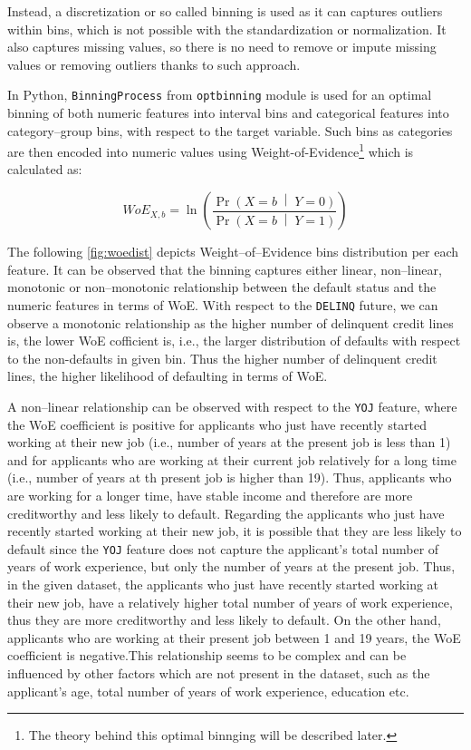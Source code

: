 Instead, a discretization or so called binning is used as it can captures outliers within bins, which is not possible with the standardization or normalization. It also captures missing values, so there is no need to remove or impute missing values or removing outliers thanks to such approach.

In Python, \lstinline{BinningProcess} from \lstinline{optbinning} module is used for an optimal binning of both numeric features into interval bins and categorical features into category--group bins, with respect to the target variable. Such bins as categories are then encoded into numeric values using Weight-of-Evidence\footnote{The theory behind this optimal binnging will be described later.} which is calculated as:

\begin{equation}\label{eq}
	WoE_{X, b}= \ln \left(\frac{\Pr{\left(X = b\;\middle|\;Y = 0\right)}}{\Pr{\left(X = b\;\middle|\;Y = 1\right)}}\right)
\end{equation}

The following \autoref{fig:woedist} depicts Weight--of--Evidence bins distribution per each feature. It can be observed that the binning captures either linear, non--linear, monotonic or non--monotonic relationship between the default status and the numeric features in terms of WoE.
With respect to the \texttt{DELINQ} future, we can observe a monotonic relationship as the higher number of delinquent credit lines is, the lower WoE cofficient is, i.e., the larger distribution of defaults with respect to the non-defaults in given bin.
Thus the higher number of delinquent credit lines, the higher likelihood of defaulting in terms of WoE.

A non--linear relationship can be observed with respect to the \texttt{YOJ} feature, where the WoE coefficient is positive for applicants who just have recently started working at their new job (i.e., number of years at the present job is less than 1) and for applicants who are working at their current job relatively for a long time (i.e., number of years at th present job is higher than 19).
Thus, applicants who are working for a longer time, have stable income and therefore are more creditworthy and less likely to default.
Regarding the applicants who just have recently started working at their new job, it is possible that they are less likely to default since the \texttt{YOJ} feature does not capture the applicant's total number of years of work experience, but only the number of years at the present job.
Thus, in the given dataset, the applicants who just have recently started working at their new job, have a relatively higher total number of years of work experience, thus they are more creditworthy and less likely to default.
On the other hand, applicants who are working at their present job between 1 and 19 years, the WoE coefficient is negative.This relationship seems to be complex and can be influenced by other factors which are not present in the dataset, such as the applicant's age, total number of years of work experience, education etc.

